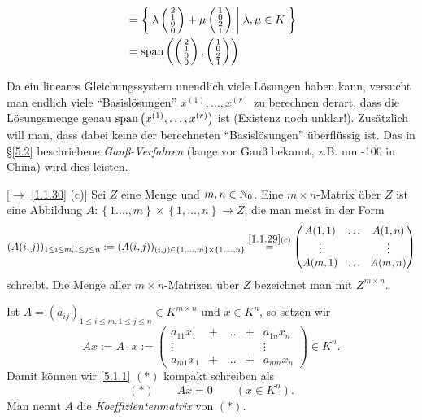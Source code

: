 \documentclass[../../main.tex]{subfiles}
\begin{document}
\begin{bsp}
\begin{enumerate}[\normalfont(a)]
\begin{align*}
&=\Set{\lambda\left(\begin{smallmatrix}2\\1\\0\\0\end{smallmatrix}\right)+\mu\left(\begin{smallmatrix}1\\0\\2\\1\end{smallmatrix}\right)| \lambda,\mu\in K}\\
&=\operatorname{span}\left(\left(\begin{smallmatrix}2\\1\\0\\0\end{smallmatrix}\right),\left(\begin{smallmatrix}1\\0\\2\\1\end{smallmatrix}\right)\right)
\end{align*}
\end{enumerate}
\end{bsp}

\begin{bem}\label{5.1.7}
Da ein lineares Gleichungssystem unendlich viele Lösungen haben kann, versucht man endlich viele "`Basislösungen"' $x^{(1)},\ldots,x^{(r)}$ zu berechnen derart, dass die Lösungsmenge genau $\operatorname{span}\left(x^{(1)},\ldots,x^{(r)}\right)$ ist (Existenz noch unklar!). Zusätzlich will man, dass dabei keine der berechneten "`Basislösungen"' überflüssig ist. Das in §\ref{5.2} beschriebene \emph{Gauß-Verfahren} (lange vor Gauß bekannt, z.B. um -100 in China) wird dies leisten.
\end{bem}


\begin{remdef}\label{5.1.8}
[$\to$ \ref{1.1.30} (c)] Sei $Z$ eine Menge und $m,n\in\mathbb N_0$. Eine $m\times n$-Matrix über $Z$ ist eine Abbildung $A:\left\{1.\ldots,m\right\}\times\left\{1,\ldots,n\right\}\to Z$, die man meist in der Form
\[(A(i,j))_{1\leq i\leq m, 1\leq j\leq n}:=(A(i,j))_{(i,j)\in\left\{1,\ldots,m\right\}\times\left\{1,\ldots,n\right\}}\overset{\ref{1.1.29}(c)}=
\begin{pmatrix}
A(1,1) & \ldots & A(1,n)\\
\vdots & & \vdots\\
A(m,1) & \ldots & A(m,n)
\end{pmatrix}\] schreibt.
Die Menge aller $m\times n$-Matrizen über $Z$ bezeichnet man mit $Z^{m\times n}$.
\end{remdef}

\begin{sprnt}\label{5.1.9}
Ist $A=(a_{ij})_{1\leq i\leq m, 1\leq j\leq n}\in K^{m\times n}$ und $x\in K^n$, so setzen wir
$$Ax:=A\cdot x:=
\begin{pmatrix}
a_{11}x_1 & + & \ldots & + & a_{1n}x_n\\
\vdots & & & & \vdots\\
a_{m1}x_1 & + & \ldots & + & a_{mn}x_n
\end{pmatrix}
\in K^n.$$
Damit können wir \ref{5.1.1} $(*)$ kompakt schreiben als 
$$(*)\qquad Ax = 0 \qquad(x\in K^n).$$
Man nennt $A$ die \emph{Koeffizientenmatrix} von $(*)$.
\end{sprnt}
\end{document}

